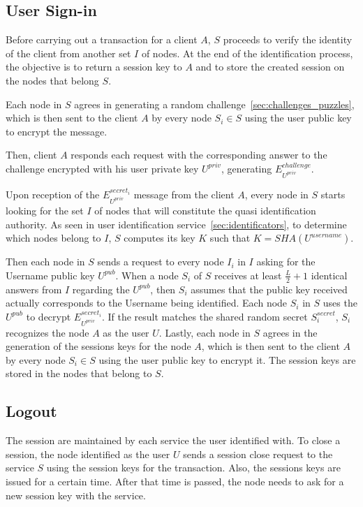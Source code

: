 \subsection{User Sign-in}

Before carrying out a transaction for a client $A$, $S$ proceeds to
verify the identity of the client from another set $I$ of nodes. At the end of
the identification process, the objective is to return a session key to $A$
and to store the created session on the nodes that belong $S$.

Each node in $S$ agrees in generating a random challenge~\ref{sec:challenges_puzzles}, which is then sent to the
client $A$ by every node $S_i \in S$ using the user public key to encrypt the
message.

Then, client $A$ responds each request with the corresponding answer to the
challenge encrypted with his user private key $U^{priv}$, generating
$E^{challenge}_{U^{priv}}$. 

Upon reception of the $E^{secret_i}_{U^{priv}}$ message from the client $A$, every node in $S$
starts looking for the set $I$ of nodes that will constitute the quasi
identification authority. As seen in user identification service~\ref{sec:identificators}, to
determine which nodes belong to $I$, $S$ computes
its key $K$ such that $K = SHA(U^{username})$.

Then each node in $S$ sends a request to every node $I_i$ in $I$ asking for the Username public key $U^{pub}$. When a node
$S_i$ of $S$ receives at least $\frac{L}{2} + 1$ identical answers from
$I$ regarding the $U^{pub}$, then $S_i$ assumes that the public key received
actually corresponds to the Username being identified. Each node $S_i$ in $S$
uses the $U^{pub}$ to decrypt $E^{secret_i}_{U^{priv}}$. If the result matches
the shared random secret $S^{secret}_i$, $S_i$ recognizes the node $A$ as the
user $U$.
Lastly, each node in $S$ agrees in the generation of the sessions keys for the
node $A$, which is then sent to the client $A$ by every node $S_i \in S$ using
the user public key to encrypt it. The session keys are stored in the
nodes that belong to $S$.

\subsection{Logout}
The session are maintained by each service the user identified with. To close a
session, the node identified as the user $U$ sends a session close request to
the service $S$ using the session keys for the transaction. Also, the sessions
keys are issued for a certain time. After that time is passed, the node needs
to ask for a new session key with the service.


